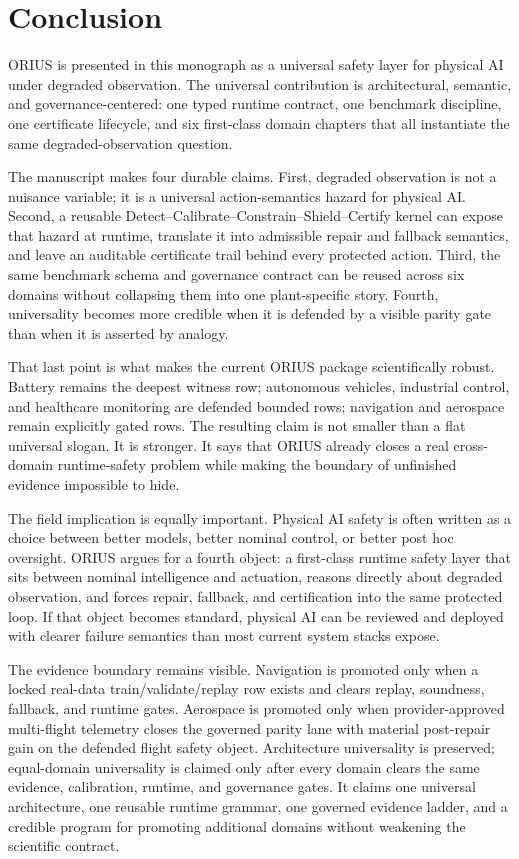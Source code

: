 \chapter{Conclusion}
\label{ch:monograph-conclusion}

ORIUS is presented in this monograph as a universal safety layer for physical AI under
degraded observation.  The universal contribution is architectural, semantic, and
governance-centered: one typed runtime contract, one benchmark discipline, one
certificate lifecycle, and six first-class domain chapters that all instantiate the
same degraded-observation question.

The manuscript makes four durable claims.  First, degraded observation is not a
nuisance variable; it is a universal action-semantics hazard for physical AI.  Second,
a reusable Detect--Calibrate--Constrain--Shield--Certify kernel can expose that hazard
at runtime, translate it into admissible repair and fallback semantics, and leave an
auditable certificate trail behind every protected action.  Third, the same benchmark
schema and governance contract can be reused across six domains without collapsing
them into one plant-specific story.  Fourth, universality becomes more credible when
it is defended by a visible parity gate than when it is asserted by analogy.

That last point is what makes the current ORIUS package scientifically robust. Battery remains the deepest witness row; autonomous vehicles, industrial control, and healthcare monitoring are defended bounded rows; navigation and aerospace remain explicitly gated rows. The resulting claim is not smaller than a flat universal
slogan.  It is stronger.  It says that ORIUS already closes a real cross-domain
runtime-safety problem while making the boundary of unfinished evidence impossible to
hide.

The field implication is equally important.  Physical AI safety is often written as a
choice between better models, better nominal control, or better post hoc oversight.
ORIUS argues for a fourth object: a first-class runtime safety layer that sits between
nominal intelligence and actuation, reasons directly about degraded observation, and
forces repair, fallback, and certification into the same protected loop.  If that
object becomes standard, physical AI can be reviewed and deployed with clearer failure
semantics than most current system stacks expose.

The evidence boundary remains visible. Navigation is promoted only when a locked real-data train/validate/replay row exists and clears replay, soundness, fallback, and runtime gates. Aerospace is promoted only when provider-approved multi-flight telemetry closes the governed parity lane with material post-repair gain on the defended flight safety object. Architecture universality is preserved; equal-domain universality is claimed only after every domain clears the same evidence, calibration, runtime, and governance gates. It claims one universal
architecture, one reusable runtime grammar, one governed evidence ladder, and a
credible program for promoting additional domains without weakening the scientific
contract.
